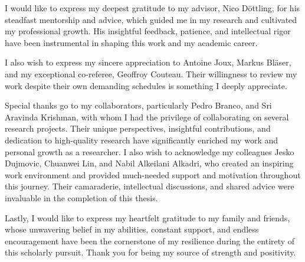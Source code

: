 
 I would like to express my deepest gratitude to my advisor, Nico D\"ottling, for his steadfast mentorship and advice, which guided me in my research and cultivated my professional growth. His insightful feedback, patience, and intellectual rigor have been instrumental in shaping this work and my academic career.

I also wish to express my sincere appreciation to Antoine Joux, Markus Bl\"aser, and my exceptional co-referee, Geoffroy Couteau. Their willingness to review my work despite their own demanding schedules is something I deeply appreciate. 

Special thanks go to my collaborators, particularly Pedro Branco, and Sri Aravinda Krishman, with whom I had the privilege of collaborating on several research projects. Their unique perspectives, insightful contributions, and dedication to high-quality research have significantly enriched my work and personal growth as a researcher.
I also wish to acknowledge my colleagues Jesko Dujmovic, Chuanwei Lin, and Nabil Alkeilani Alkadri, who created an inspiring work environment and provided much-needed support and motivation throughout this journey. Their camaraderie, intellectual discussions, and shared advice were invaluable in the completion of this thesis.

Lastly, I would like to express my heartfelt gratitude to my family and friends, whose unwavering belief in my abilities, constant support, and endless encouragement have been the cornerstone of my resilience during the entirety of this scholarly pursuit. Thank you for being my source of strength and positivity.
